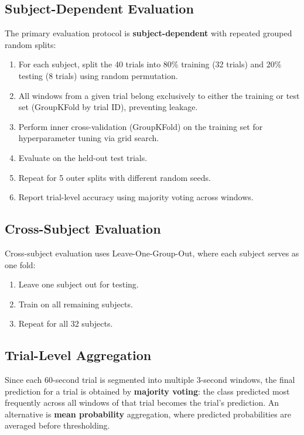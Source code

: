 \documentclass[12pt,a4paper]{report}
\begin{document}
\subsection{Subject-Dependent Evaluation}

The primary evaluation protocol is \textbf{subject-dependent} with repeated
grouped random splits:

\begin{enumerate}[noitemsep]
    \item For each subject, split the 40 trials into 80\% training (32 trials)
          and 20\% testing (8 trials) using random permutation.
    \item All windows from a given trial belong exclusively to either the
          training or test set (GroupKFold by trial ID), preventing leakage.
    \item Perform inner cross-validation (GroupKFold) on the training set for
          hyperparameter tuning via grid search.
    \item Evaluate on the held-out test trials.
    \item Repeat for 5 outer splits with different random seeds.
    \item Report trial-level accuracy using majority voting across windows.
\end{enumerate}

\subsection{Cross-Subject Evaluation}

Cross-subject evaluation uses Leave-One-Group-Out, where each subject serves
as one fold:

\begin{enumerate}[noitemsep]
    \item Leave one subject out for testing.
    \item Train on all remaining subjects.
    \item Repeat for all 32 subjects.
\end{enumerate}

\subsection{Trial-Level Aggregation}

Since each 60-second trial is segmented into multiple 3-second windows, the
final prediction for a trial is obtained by \textbf{majority voting}: the class
predicted most frequently across all windows of that trial becomes the trial's
prediction. An alternative is \textbf{mean probability} aggregation, where
predicted probabilities are averaged before thresholding.
\end{document}
